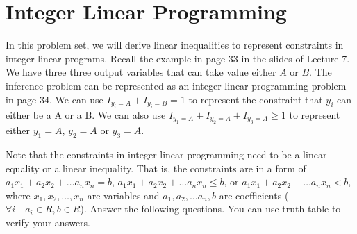 \section{Integer Linear Programming} 
In this problem set, we will derive linear inequalities to represent constraints in integer linear programs. 
Recall the example in page 33 in the slides of Lecture 7. We have three three output variables that can take value either $A$ or $B$. The inference problem can be represented as an integer linear programming problem in page 34.  We can use $I_{y_i=A}+I_{y_i=B}=1$ to represent the constraint that $y_i$ can either be a A or a B. We can also use $I_{y_1=A}+I_{y_2=A}+I_{y_3=A}  \geq 1$ to represent either $y_1=A$, $y_2 =A$ or  $y_3 =A$.

Note that the constraints in integer linear programming need to be a linear equality or a linear inequality. That is, the constraints are  in a form of $a_1 x_1+ a_2 x_2 + \ldots a_n x_n = b$,  $a_1 x_1+ a_2 x_2 + \ldots a_n x_n \leq b$, or 
$a_1 x_1+ a_2 x_2 + \ldots a_n x_n < b$, where
$x_1, x_2, \ldots, x_n$ are variables and $a_1, a_2, \ldots a_n, b$ are coefficients ($\forall i \quad a_i\in R, b\in R$).  Answer the following questions. You can use truth table to verify your answers.
